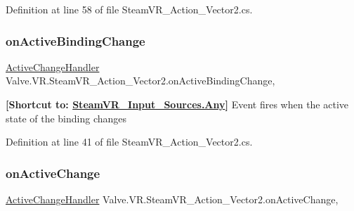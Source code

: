 Definition at line 58 of file Steam\+V\+R\+\_\+\+Action\+\_\+\+Vector2.\+cs.

\mbox{\label{class_valve_1_1_v_r_1_1_steam_v_r___action___vector2_a0629b2634326464fc8ae3131e1c75ef4}} 
\subsubsection{\texorpdfstring{onActiveBindingChange}{onActiveBindingChange}}
{\footnotesize\ttfamily \mbox{\hyperlink{class_valve_1_1_v_r_1_1_steam_v_r___action___vector2_ad01c83284de71c0d9cd8f7e673ce5ab5}{Active\+Change\+Handler}} Valve.\+V\+R.\+Steam\+V\+R\+\_\+\+Action\+\_\+\+Vector2.\+on\+Active\+Binding\+Change\hspace{0.3cm}{\ttfamily [add]}, {\ttfamily [remove]}}



{\bfseries{\mbox{[}Shortcut to\+: \mbox{\hyperlink{namespace_valve_1_1_v_r_a82e5bf501cc3aa155444ee3f0662853faed36a1ef76a59ee3f15180e0441188ad}{Steam\+V\+R\+\_\+\+Input\+\_\+\+Sources.\+Any}}\mbox{]}}} Event fires when the active state of the binding changes 



Definition at line 41 of file Steam\+V\+R\+\_\+\+Action\+\_\+\+Vector2.\+cs.

\mbox{\label{class_valve_1_1_v_r_1_1_steam_v_r___action___vector2_afaa6f3e9d0ef1e3ef5555401598de607}} 
\subsubsection{\texorpdfstring{onActiveChange}{onActiveChange}}
{\footnotesize\ttfamily \mbox{\hyperlink{class_valve_1_1_v_r_1_1_steam_v_r___action___vector2_ad01c83284de71c0d9cd8f7e673ce5ab5}{Active\+Change\+Handler}} Valve.\+V\+R.\+Steam\+V\+R\+\_\+\+Action\+\_\+\+Vector2.\+on\+Active\+Change\hspace{0.3cm}{\ttfamily [add]}, {\ttfamily [remove]}}



